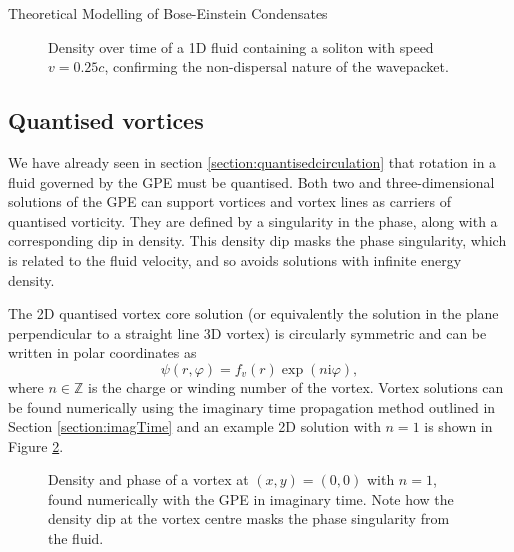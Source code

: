\begin{chapter}{\label{cha:theoretical_model}Theoretical Modelling of Bose-Einstein Condensates}
\begin{figure}[!ht]
  \caption{Density over time of a 1D fluid containing a soliton with speed $v=0.25c$, confirming the non-dispersal nature of the wavepacket.}\label{fig_solitonmove}
 \end{figure}


\subsection{\label{section:vortices} Quantised vortices}
We have already seen in section \ref{section:quantisedcirculation} that rotation in a fluid governed by the GPE must be quantised. Both two and three-dimensional solutions of the GPE can support vortices and vortex lines as carriers of quantised vorticity. They are defined by a singularity in the phase, along with a corresponding dip in density. This density dip masks the phase singularity, which is related to the fluid velocity, and so avoids solutions with infinite energy density.

The 2D quantised vortex core solution (or equivalently the solution in the plane perpendicular to a straight line 3D vortex) is circularly symmetric and can be written in polar coordinates as
	\begin{equation}\label{eq_vortexsol}
	\psi(r,\varphi) = f_v(r)\exp(n\mathrm{i}\varphi),
	\end{equation}
where $n\in\mathbb{Z}$ is the charge or winding number of the vortex. Vortex solutions can be found numerically using the imaginary time propagation method outlined in Section \ref{section:imagTime} and an example 2D solution with $n=1$ is shown in Figure \ref{fig_vortexdensphase}.

\begin{figure}[!ht]
	\centering
  \caption{Density and phase of a vortex at $(x,y) = (0,0)$ with $n=1$, found numerically with the GPE in imaginary time. Note how the density dip at the vortex centre masks the phase singularity from the fluid. }\label{fig_vortexdensphase}
 \end{figure}


\end{chapter}
